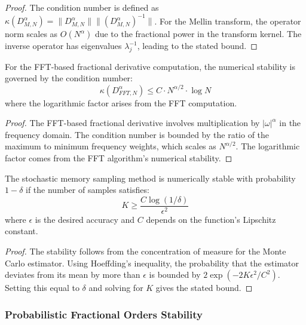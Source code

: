 \begin{proof}
The condition number is defined as $\kappa(D^{\alpha}_{M,N}) = \|D^{\alpha}_{M,N}\| \|(D^{\alpha}_{M,N})^{-1}\|$. For the Mellin transform, the operator norm scales as $O(N^{\alpha})$ due to the fractional power in the transform kernel. The inverse operator has eigenvalues $\lambda_j^{-1}$, leading to the stated bound.
\end{proof}

\begin{theorem}
For the FFT-based fractional derivative computation, the numerical stability is governed by the condition number:
\begin{equation}
\kappa(D^{\alpha}_{FFT,N}) \leq C \cdot N^{\alpha/2} \cdot \log N
\end{equation}
where the logarithmic factor arises from the FFT computation.
\end{theorem}

\begin{proof}
The FFT-based fractional derivative involves multiplication by $|\omega|^{\alpha}$ in the frequency domain. The condition number is bounded by the ratio of the maximum to minimum frequency weights, which scales as $N^{\alpha/2}$. The logarithmic factor comes from the FFT algorithm's numerical stability.
\end{proof}

\begin{theorem}
The stochastic memory sampling method is numerically stable with probability $1-\delta$ if the number of samples satisfies:
\begin{equation}
K \geq \frac{C \log(1/\delta)}{\epsilon^2}
\end{equation}
where $\epsilon$ is the desired accuracy and $C$ depends on the function's Lipschitz constant.
\end{theorem}

\begin{proof}
The stability follows from the concentration of measure for the Monte Carlo estimator. Using Hoeffding's inequality, the probability that the estimator deviates from its mean by more than $\epsilon$ is bounded by $2\exp(-2K\epsilon^2/C^2)$. Setting this equal to $\delta$ and solving for $K$ gives the stated bound.
\end{proof}

\subsubsection{Probabilistic Fractional Orders Stability}

